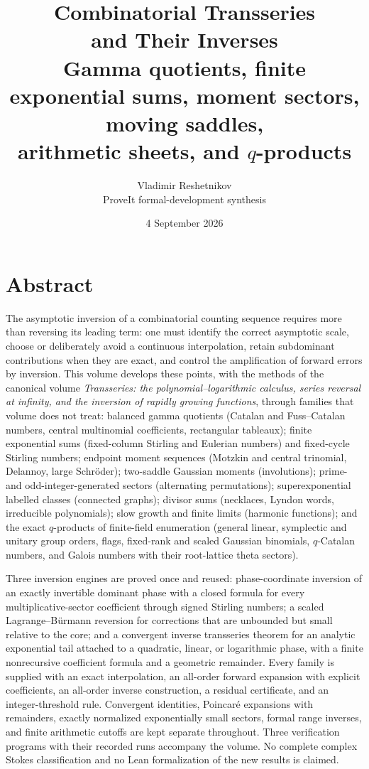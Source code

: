 \documentclass[11pt,openany]{book}
\numberwithin{equation}{chapter}
\theoremstyle{plain}
\theoremstyle{definition}
\theoremstyle{remark}
\newenvironment{abstract}{\chapter*{Abstract}\addcontentsline{toc}{chapter}{Abstract}}{}
\begin{document}
\frontmatter
\title{\textbf{Combinatorial Transseries\\and Their Inverses}\\[0.5em]
  \Large Gamma quotients, finite exponential sums, moment sectors, moving saddles,\\
  arithmetic sheets, and $q$-products}
\author{Vladimir Reshetnikov\\\small ProveIt formal-development synthesis}
\date{4 September 2026}
\maketitle

\begin{abstract}
The asymptotic inversion of a combinatorial counting sequence requires more
than reversing its leading term: one must identify the correct asymptotic
scale, choose or deliberately avoid a continuous interpolation, retain
subdominant contributions when they are exact, and control the amplification
of forward errors by inversion.  This volume develops these points, with the
methods of the canonical volume \emph{Transseries: the polynomial--logarithmic
calculus, series reversal at infinity, and the inversion of rapidly growing
functions}, through families that volume does not treat: balanced gamma
quotients (Catalan and Fuss--Catalan numbers, central multinomial
coefficients, rectangular tableaux); finite exponential sums (fixed-column
Stirling and Eulerian numbers) and fixed-cycle Stirling numbers; endpoint
moment sequences (Motzkin and central trinomial, Delannoy, large Schr\"oder);
two-saddle Gaussian moments (involutions); prime- and odd-integer-generated
sectors (alternating permutations); superexponential labelled classes
(connected graphs); divisor sums (necklaces, Lyndon words, irreducible
polynomials); slow growth and finite limits (harmonic functions); and the
exact $q$-products of finite-field enumeration (general linear, symplectic and
unitary group orders, flags, fixed-rank and scaled Gaussian binomials,
$q$-Catalan numbers, and Galois numbers with their root-lattice theta
sectors).

Three inversion engines are proved once and reused: phase-coordinate
inversion of an exactly invertible dominant phase with a closed formula for
every multiplicative-sector coefficient through signed Stirling numbers; a
scaled Lagrange--B\"urmann reversion for corrections that are unbounded but
small relative to the core; and a convergent inverse transseries theorem for
an analytic exponential tail attached to a quadratic, linear, or logarithmic
phase, with a finite nonrecursive coefficient formula and a geometric
remainder.  Every family is supplied with an exact interpolation, an
all-order forward expansion with explicit coefficients, an all-order inverse
construction, a residual certificate, and an integer-threshold rule.
Convergent identities, Poincar\'e expansions with remainders, exactly
normalized exponentially small sectors, formal range inverses, and finite
arithmetic cutoffs are kept separate throughout.  Three verification programs
with their recorded runs accompany the volume.  No complete complex Stokes
classification and no Lean formalization of the new results is claimed.
\end{abstract}
\end{document}
